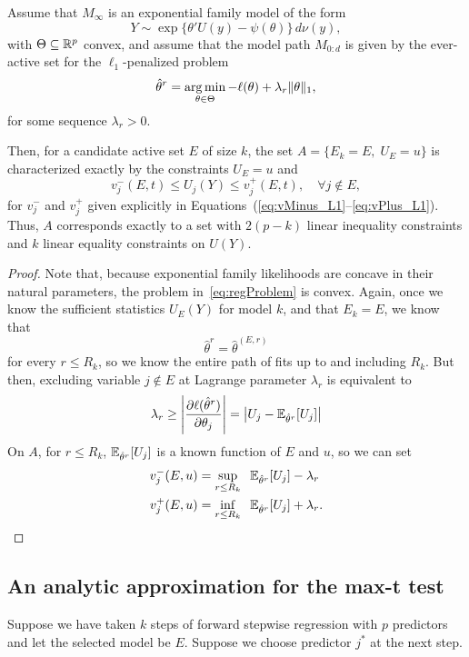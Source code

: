 \documentclass{article}
\begin{document}
\begin{theorem}
  Assume that $M_\infty$ is an exponential family model
  of the form
  \[
  Y \sim \exp\{ \theta'U(y) - \psi(\theta) \}\,d\nu(y),
  \]
  with $\Theta \subseteq \mathbb{R}^p$ convex, and assume
  that the model path $M_{0:d}$ is given 
  by the ever-active set for the $\ell_1$-penalized problem
  \begin{equation}\label{eq:regProblem}
  \hat\theta^r = \operatorname*{arg\,min}_{\theta\in \Theta} 
  -\ell(\theta) + \lambda_r\|\theta\|_1,
  \end{equation}
  for some sequence $\lambda_r > 0$.

  Then, for a candidate active set $E$ of size $k$, 
  the set $A = \{E_k = E, \;U_E = u\}$ is characterized 
  exactly by the constraints $U_E = u$ and
  \[
  v_j^-(E,t) \leq U_j(Y) \leq v_j^+(E,t), \quad\forall j \notin E,
  \]
  for $v_j^-$ and $v_j^+$ given explicitly in
  Equations~(\ref{eq:vMinus_L1}--\ref{eq:vPlus_L1}).
  Thus, $A$ corresponds exactly to 
  a set with $2(p-k)$ linear inequality constraints and $k$
  linear equality constraints on $U(Y)$.
\end{theorem}

\begin{proof}
  Note that, because exponential family likelihoods are concave in their natural parameters, the problem in~\eqref{eq:regProblem} is convex. Again, once we know the sufficient statistics $U_E(Y)$ for model $k$, and that $E_k=E$, we know that
  \[
  \hat\theta^r = \hat\theta^{(E,r)}
  \]
  for every $r \leq R_k$, so we know the entire path of fits up to and including $R_k$. But then, excluding variable $j \notin E$ at Lagrange parameter $\lambda_r$ is equivalent to
  \[
  \lambda_r \geq 
  \left| \frac{\partial \ell(\hat\theta^r)}{\partial \theta_j} \right|
  = \left|U_j - \mathbb{E}_{\hat\theta^r}[U_j]\right|
  \]
  On $A$, for $r \leq R_k$, 
  $\mathbb{E}_{\hat\theta^r}[U_j]$ is a known function of $E$ and $u$,
  so we can set
  \begin{align}\label{eq:vMinus_L1}
    v_j^-(E,u) &= \sup_{r \leq R_k} \;\; 
    \mathbb{E}_{\hat\theta^r}[U_j] - \lambda_r \\
    \label{eq:vPlus_L1}
    v_j^+(E,u) &= \inf_{r \leq R_k} \;\;
    \mathbb{E}_{\hat\theta^r}[U_j] + \lambda_r .
  \end{align}
\end{proof}


\subsection{An analytic approximation for the max-t test}
 Suppose we have taken $k$ steps of forward stepwise regression with $p$ predictors and let the selected model  
 be $E$. Suppose we choose predictor $j^*$ at the next step.
 
\end{document}
